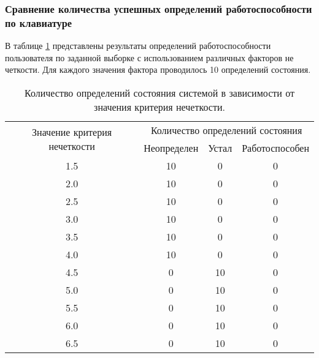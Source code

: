 \subsubsection[Сравнение количества успешных определений работоспособности по \newline клавиатуре]{Сравнение количества успешных определений работоспособности по клавиатуре}

В таблице \ref{table:time2} представлены результаты определений работоспособности пользователя по заданной выборке с использованием различных факторов не \-четкости. Для каждого значения фактора проводилось 10 определений состояния.

\begin{table}[H]
	\begin{center}
		\caption{\label{table:time2} Количество определений состояния системой в зависимости от значения критерия нечеткости.}
		\begin{tabular}{|c|ccc|}
			\hline
			\multirow{2}{*}{Значение критерия нечеткости} & \multicolumn{3}{c|}{Количество определений состояния}\\ \cline{2-4} & \multicolumn{1}{c|}{Неопределен} & \multicolumn{1}{c|}{Устал} & Работоспособен \\ \hline
			1.5& \multicolumn{1}{c|}{10}            & \multicolumn{1}{c|}{0}      &0 \\ \hline
			2.0& \multicolumn{1}{c|}{10}            & \multicolumn{1}{c|}{0}     &0 \\ \hline
			2.5& \multicolumn{1}{c|}{10}            & \multicolumn{1}{c|}{0}     &0 \\ \hline
			3.0& \multicolumn{1}{c|}{10}            & \multicolumn{1}{c|}{0}      &0 \\ \hline
			3.5& \multicolumn{1}{c|}{10}            & \multicolumn{1}{c|}{0}      &0 \\ \hline
			4.0& \multicolumn{1}{c|}{10}            & \multicolumn{1}{c|}{0}      &0 \\ \hline
			4.5& \multicolumn{1}{c|}{0}            & \multicolumn{1}{c|}{10}      &0 \\ \hline
			5.0& \multicolumn{1}{c|}{0}            & \multicolumn{1}{c|}{10}      &0 \\ \hline
			5.5& \multicolumn{1}{c|}{0}            & \multicolumn{1}{c|}{10}      &0 \\ \hline
			6.0& \multicolumn{1}{c|}{0}            & \multicolumn{1}{c|}{10}      &0 \\ \hline
			6.5& \multicolumn{1}{c|}{0}            & \multicolumn{1}{c|}{10}      &0 \\ \hline

\end{tabular}
\end{center}
\end{table}
